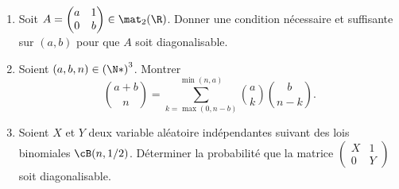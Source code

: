 \begin{enonce}
\begin{exercise}[ID={RMS127 E911},subtitle={Mines-Ponts PC 2016},tags={}, difficulty={0}]
\begin{enumerate}
  \item Soit $A= \begin{pmatrix} a&1\\0&b \end{pmatrix}\in\mat_2(\R)$.
      Donner une condition nécessaire et suffisante sur $(a,b)$ pour que $A$ soit diagonalisable.

    \item Soient $(a,b,n)\in\left( \N* \right)^3$.
      Montrer
      \begin{equation*}
        \binom{a+b}{n} = \sum_{k=\max(0, n-b)}^{\min(n,a)} \binom ak \binom{b}{n-k}.
      \end{equation*}

    \item Soient $X$ et $Y$ deux variable aléatoire indépendantes suivant des lois binomiales $\cB(n, 1/2)$.
      Déterminer la probabilité que la matrice $\begin{pmatrix} X&1\\ 0&Y \end{pmatrix}$ soit diagonalisable.  
\end{enumerate}
\end{exercise}
\begin{solution}
\end{solution}
\end{enonce}
